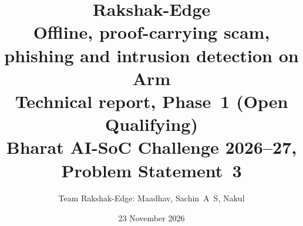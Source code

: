 \documentclass[11pt,a4paper]{article}
\title{\textbf{Rakshak-Edge}\\[4pt]
  \large Offline, proof-carrying scam, phishing and intrusion detection on Arm\\[2pt]
  \normalsize Technical report, Phase~1 (Open Qualifying)\\
  Bharat AI-SoC Challenge 2026--27, Problem Statement~3}
\author{Team Rakshak-Edge: Maadhav, Sachin~A~S, Nakul}
\date{23 November 2026}
\begin{document}
\maketitle



\tableofcontents
\bigskip











\appendix



\end{document}
